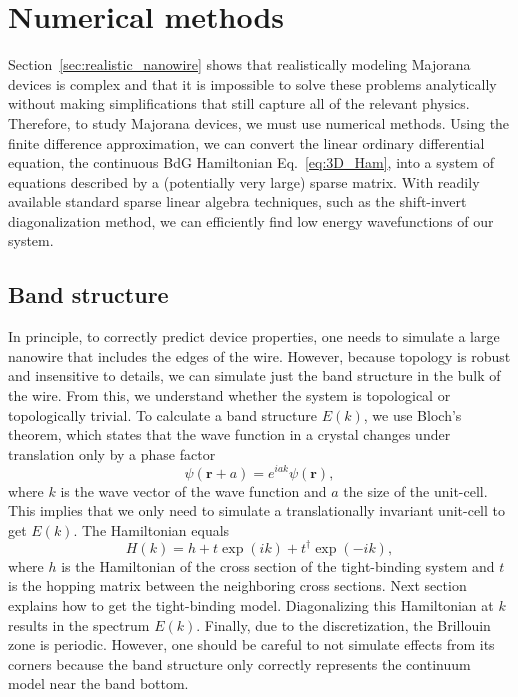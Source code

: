 \section{Numerical methods}\label{sec:numerical_methods}
Section~\ref{sec:realistic_nanowire} shows that realistically modeling Majorana devices is complex and that it is impossible to solve these problems analytically without making simplifications that still capture all of the relevant physics.
Therefore, to study Majorana devices, we must use numerical methods.
Using the finite difference approximation, we can convert the linear ordinary differential equation, the continuous BdG Hamiltonian Eq.~\eqref{eq:3D_Ham}, into a system of equations described by a (potentially very large) sparse matrix.
With readily available standard sparse linear algebra techniques, such as the shift-invert diagonalization method, we can efficiently find low energy wavefunctions of our system.

\subsection{Band structure}\label{sec:band_structure_numerics}
In principle, to correctly predict device properties, one needs to simulate a large nanowire that includes the edges of the wire.
However, because topology is robust and insensitive to details, we can simulate just the band structure in the bulk of the wire.
From this, we understand whether the system is topological or topologically trivial.
To calculate a band structure $E(k)$, we use Bloch's theorem, which states that the wave function in a crystal changes under translation only by a phase factor
\begin{equation}
\psi(\bm{r}+a) = e^{i a k}\psi(\bm{r}),
\end{equation}
where $k$ is the wave vector of the wave function and $a$ the size of the unit-cell.
This implies that we only need to simulate a translationally invariant unit-cell to get $E(k)$.
The Hamiltonian equals  %
\begin{equation}
H\left(k\right) = h + t\exp(ik) + t^{\dagger}\exp(-ik),
\end{equation}
where $h$ is the Hamiltonian of the cross section of the tight-binding system and $t$ is the hopping matrix between the neighboring cross sections.
Next section explains how to get the tight-binding model.
Diagonalizing this Hamiltonian at $k$ results in the spectrum $E(k)$.
Finally, due to the discretization, the Brillouin zone is periodic.
However, one should be careful to not simulate effects from its corners because the band structure only correctly represents the continuum model near the band bottom.

